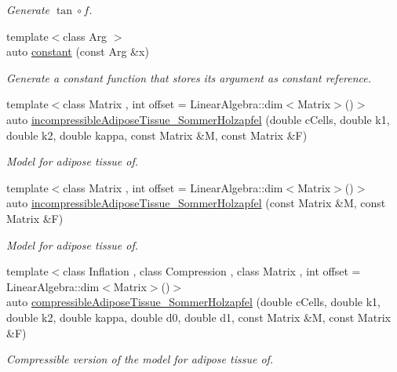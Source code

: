 \begin{DoxyCompactItemize}
\begin{DoxyCompactList}\small\item\em \-Generate $ \tan\circ f $. \end{DoxyCompactList}\item 
{\footnotesize template$<$class Arg $>$ }\\auto \hyperlink{namespaceFunG_a65c509062b62b3303268cabc97b75a65}{constant} (const \-Arg \&x)
\begin{DoxyCompactList}\small\item\em \-Generate a constant function that stores its argument as constant reference. \end{DoxyCompactList}\item 
{\footnotesize template$<$class Matrix , int offset = \-Linear\-Algebra\-::dim$<$\-Matrix$>$()$>$ }\\auto \hyperlink{group__Biomechanics_gac269eefc1abb994044e1634c20a98061}{incompressible\-Adipose\-Tissue\-\_\-\-Sommer\-Holzapfel} (double c\-Cells, double k1, double k2, double kappa, const \-Matrix \&\-M, const \-Matrix \&\-F)
\begin{DoxyCompactList}\small\item\em \-Model for adipose tissue of. \end{DoxyCompactList}\item 
{\footnotesize template$<$class Matrix , int offset = \-Linear\-Algebra\-::dim$<$\-Matrix$>$()$>$ }\\auto \hyperlink{group__Biomechanics_ga01ab128bcf179f4431b0270179af9e20}{incompressible\-Adipose\-Tissue\-\_\-\-Sommer\-Holzapfel} (const \-Matrix \&\-M, const \-Matrix \&\-F)
\begin{DoxyCompactList}\small\item\em \-Model for adipose tissue of. \end{DoxyCompactList}\item 
{\footnotesize template$<$class Inflation , class Compression , class Matrix , int offset = \-Linear\-Algebra\-::dim$<$\-Matrix$>$()$>$ }\\auto \hyperlink{group__Biomechanics_ga5c3388564c0420b62e58f48c739d27f1}{compressible\-Adipose\-Tissue\-\_\-\-Sommer\-Holzapfel} (double c\-Cells, double k1, double k2, double kappa, double d0, double d1, const \-Matrix \&\-M, const \-Matrix \&\-F)
\begin{DoxyCompactList}\small\item\em \-Compressible version of the model for adipose tissue of. \end{DoxyCompactList}\item 

\end{DoxyCompactItemize}
